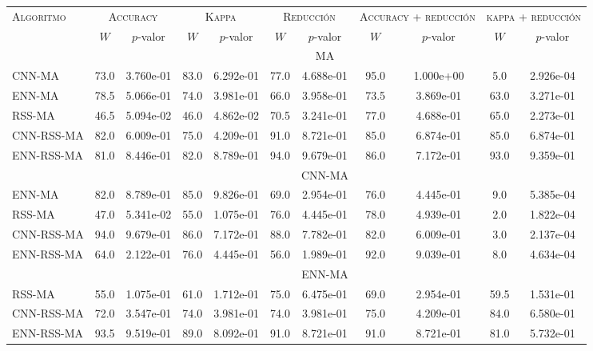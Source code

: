 \begin{table}[]
\centering
\begin{adjustbox}{max width =\textwidth}
\begin{tabular}{l c c c c c c c c c c}
\hline
\multirow{2}{*}{\textsc{Algoritmo}}
	& \multicolumn{2}{c}{\textsc{Accuracy}}
	& \multicolumn{2}{c}{\textsc{Kappa}}
	& \multicolumn{2}{c}{\textsc{Reducción}} 
	& \multicolumn{2}{c}{\textsc{Accuracy + reducción}} 
	& \multicolumn{2}{c}{\textsc{kappa + reducción}} \\
 & $W$ & $p$-valor & $W$ & $p$-valor & $W$ & $p$-valor & $W$ & $p$-valor & $W$ & $p$-valor \\
\hline
\hline

 & & & & & & MA & & & & \\

CNN-MA   & 73.0 & 3.760e-01 & 83.0 & 6.292e-01 & 77.0 & 4.688e-01 & 95.0 & 1.000e+00 & 5.0 & 2.926e-04 \\ 
ENN-MA & 78.5 & 5.066e-01 & 74.0 & 3.981e-01 & 66.0 & 3.958e-01 & 73.5 & 3.869e-01 & 63.0 & 3.271e-01 \\ 
RSS-MA   & 46.5 & 5.094e-02 & 46.0 & 4.862e-02 & 70.5 & 3.241e-01 & 77.0 & 4.688e-01 & 65.0 & 2.273e-01 \\ 
CNN-RSS-MA   & 82.0 & 6.009e-01 & 75.0 & 4.209e-01 & 91.0 & 8.721e-01 & 85.0 & 6.874e-01 & 85.0 & 6.874e-01 \\ 
ENN-RSS-MA & 81.0 & 8.446e-01 & 82.0 & 8.789e-01 & 94.0 & 9.679e-01 & 86.0 & 7.172e-01 & 93.0 & 9.359e-01 \\ 

\hline

 & & & & & & CNN-MA & & & & \\
ENN-MA  & 82.0 & 8.789e-01 & 85.0 & 9.826e-01 & 69.0 & 2.954e-01 & 76.0 & 4.445e-01 & 9.0 & 5.385e-04 \\ 
RSS-MA    & 47.0 & 5.341e-02 & 55.0 & 1.075e-01 & 76.0 & 4.445e-01 & 78.0 & 4.939e-01 & 2.0 & 1.822e-04 \\ 
CNN-RSS-MA & 94.0 & 9.679e-01 & 86.0 & 7.172e-01 & 88.0 & 7.782e-01 & 82.0 & 6.009e-01 & 3.0 & 2.137e-04 \\ 
ENN-RSS-MA & 64.0 & 2.122e-01 & 76.0 & 4.445e-01 & 56.0 & 1.989e-01 & 92.0 & 9.039e-01 & 8.0 & 4.634e-04 \\

\hline

 & & & & & & ENN-MA & & & & \\
RSS-MA  & 55.0 & 1.075e-01 & 61.0 & 1.712e-01 & 75.0 & 6.475e-01 & 69.0 & 2.954e-01 & 59.5 & 1.531e-01 \\ 
CNN-RSS-MA & 72.0 & 3.547e-01 & 74.0 & 3.981e-01 & 74.0 & 3.981e-01 & 75.0 & 4.209e-01 & 84.0 & 6.580e-01 \\ 
ENN-RSS-MA & 93.5 & 9.519e-01 & 89.0 & 8.092e-01 & 91.0 & 8.721e-01 & 91.0 & 8.721e-01 & 81.0 & 5.732e-01 \\ 


\end{tabular}
\end{adjustbox}
\end{table}
